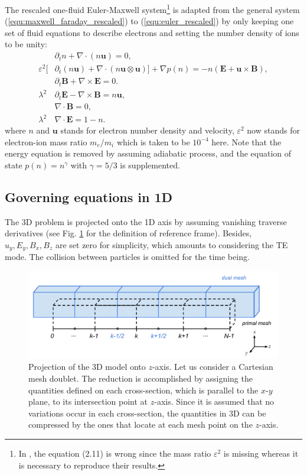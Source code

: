 \documentclass{report}
\begin{document}
The rescaled one-fluid Euler-Maxwell system\footnote{In \cite{degond_2012}, the equation (2.11) is wrong since the mass ratio $\varepsilon^2$ is missing whereas it is necessary to reproduce their results.} is adapted from the general system (\ref{equ:maxwell_faraday_rescaled}) to (\ref{equ:euler_rescaled}) by only keeping one set of fluid equations to describe electrons and setting the number density of ions to be unity:
\begin{align}
    & \partial_t n + \nabla\cdot(n \mathbf{u}) = 0, \label{equ:EM_1f_n}\\
    \varepsilon^2[& \partial_t (n \mathbf{u}) + \nabla \cdot (n \mathbf{u} \otimes \mathbf{u})] + \nabla p(n) = -n(\mathbf{E} + \mathbf{u} \times \mathbf{B}), \label{equ:EM_1f_nu}\\
    & \partial_t \mathbf{B} + \nabla \times \mathbf{E} = 0 \label{equ:EM_1f_faraday}. \\
    \lambda^2 & \partial_t \mathbf{E} - \nabla \times \mathbf{B} = n \mathbf{u}, \label{equ:EM_1f_ampere}\\
    & \nabla\cdot \mathbf{B} = 0, \label{equ:EM_1f_gauss_B} \\
    \lambda^2 & \nabla\cdot \mathbf{E} = 1 - n \label{equ:EM_1f_gauss_E}.
\end{align}
where $n$ and $\mathbf{u}$ stands for electron number density and velocity, $\varepsilon^2$ now stands for electron-ion mass ratio $m_e/m_i$ which is taken to be $10^{-4}$ here. Note that the energy equation is removed by assuming adiabatic process, and the equation of state $p(n) = n^\gamma$ with $\gamma = 5/3$ is supplemented.  

\subsection{Governing equations in 1D} \label{sec:1f-eqs-1d}
The 3D problem is projected onto the 1D axis by assuming vanishing traverse derivatives (see Fig. \ref{fig:1d-frame} for the definition of reference frame). Besides, $u_y, E_y, B_x, B_z$ are set zero for simplicity, which amounts to considering the TE mode. The collision between particles is omitted for the time being. 
\begin{figure}
    \centering
    \includegraphics[scale=0.2]{1d_frame.png}
    \caption{Projection of the 3D model onto $z$-axis. Let us consider a Cartesian mesh doublet. The reduction is accomplished by assigning the quantities defined on each cross-section, which is parallel to the $x$-$y$ plane, to its intersection point at $z$-axis. Since it is assumed that no variations occur in each cross-section, the quantities in 3D can be compressed by the ones that locate at each mesh point on the $z$-axis.}
    \label{fig:1d-frame}
\end{figure}
\end{document}
